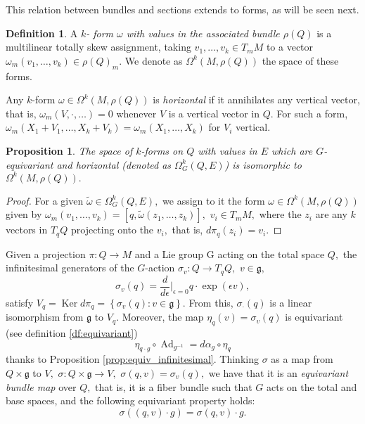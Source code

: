 \documentclass[12pt, letterpaper, reqno]{amsart}
\theoremstyle{definition}
\newtheorem{df}{Definition}
\theoremstyle{plain}
\newtheorem{prop}{Proposition}
\theoremstyle{remark}
\begin{document}
This relation between bundles and sections extends to forms, as will be seen next.

\begin{df}
	A \textit{$ k $- form $ \omega $ with values in the associated bundle $ \rho(Q) $} is a multilinear totally skew assignment, taking $ v_1,\dots, v_k\in T_mM $ to a vector $ \omega_m(v_1,\dots,v_k)\in \rho(Q)_m. $  We denote as $ \Omega^k(M, \rho(Q)) $ the space of these forms.
\end{df}

Any $ k $-form $ \omega\in \Omega^k(M,\rho(Q)) $ is \textit{horizontal} if it annihilates any vertical vector, that is, $ \omega_m(V,\cdot,\dots)=0 $ whenever $ V $ is a vertical vector in $ Q. $ For such a form, $ \omega_m(X_1+V_1,\dots,X_k+V_k)=\omega_m(X_1,\dots, X_k) $ for $ V_i $ vertical.

\begin{prop}
	The space of $ k $-forms on $ Q $ with values in $ E $ which are $ G $-equivariant and horizontal (denoted as $ \Omega^k_G(Q,E) $) is isomorphic to $ \Omega^k(M,\rho(Q)). $ 
\end{prop}
\begin{proof}
	For a given $ \tilde \omega\in\Omega^k_G(Q,E), $ we assign to it the form $ \omega\in\Omega^k(M, \rho(Q)) $ given by $ \omega_m(v_1,\dots,v_k) = [q,\tilde\omega(z_1,\dots,z_k)],  $  $v_i\in T_mM, $ where the $ z_i $ are any $ k $ vectors in $ T_qQ $ projecting onto the $ v_i, $ that is, $ d\pi_q(z_i)=v_i. $  
\end{proof}

Given a projection $ \pi: Q \rightarrow M $ and a Lie group G acting on the total space $ Q, $ the infinitesimal generators of the $ G $-action $ \sigma_v: Q \rightarrow T_qQ, $ $ v\in \mathfrak{g,} $ 
$$ \sigma_v(q) = \frac{d}{d\epsilon} \Big|_{\epsilon=0} q\cdot \operatorname{exp} (\epsilon v),$$
satisfy $ V_q = \operatorname{Ker}d\pi_q = \left\{ \sigma_v(q): v\in \mathfrak{g} \right\} .  $ From this, $ \sigma_\cdot(q) $ is a linear isomorphism from $ \mathfrak{g} $ to $ V_q. $ Moreover, the map $ \eta_q(v)  = \sigma_v(q) $ is equivariant (see definition \ref{df:equivariant})
$$ \eta_{q\cdot g}\circ \operatorname{Ad}_{g^{-1}} = d\alpha_g  \circ \eta_q $$ 
thanks to Proposition \ref{prop:equiv_infinitesimal}. Thinking $ \sigma $ as a map from $ Q\times \mathfrak{g} $ to $ V, $ $ \sigma:Q\times \mathfrak{g}\rightarrow V, $ $ \sigma(q,v)= \sigma_v(q), $ we have that it is an \textit{equivariant bundle map} over $ Q, $ that is, it is a fiber bundle such that $ G $ acts on the total and base spaces, and the following equivariant property holds:
$$ \sigma \left( (q,v)\cdot g \right) = \sigma(q,v) \cdot g. $$ 
\end{document}
